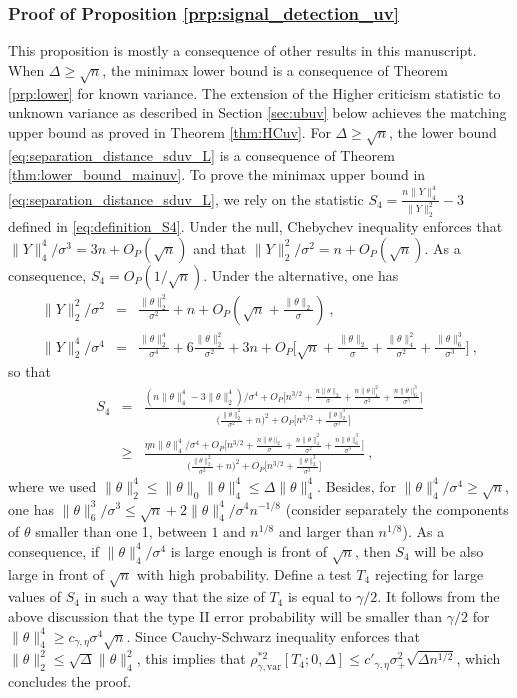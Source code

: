 \documentclass[twoside,11pt]{article}
\def\beqn{\begin{eqnarray*}}
\def\eeqn{\end{eqnarray*}}
\newcommand{\<}{\langle}
\renewcommand{\>}{\rangle}
\begin{document}
\subsubsection{Proof of Proposition \ref{prp:signal_detection_uv}}
This proposition is mostly a consequence of other results in this manuscript. When $\Delta\geq \sqrt{n}$, the minimax lower bound is a consequence of Theorem \ref{prp:lower} for known variance. The extension of the Higher criticism statistic to unknown variance as described in Section \ref{sec:ubuv} below achieves the matching upper bound as proved in Theorem \ref{thm:HCuv}. For $\Delta\geq \sqrt{n}$, the lower bound \eqref{eq:separation_distance_sduv_L} is a consequence of Theorem \ref{thm:lower_bound_mainuv}. To prove the minimax upper bound in \eqref{eq:separation_distance_sduv_L}, we rely on the statistic $S_4 = \frac{n\|Y\|_4^4}{\|Y\|_2^2}-3$ defined in \eqref{eq:definition_S4}. Under the null, Chebychev inequality enforces that $\|Y\|_4^4/\sigma^3= 3n + O_P(\sqrt{n})$ and that $\|Y\|_2^2/\sigma^2= n+O_P(\sqrt{n})$. As a consequence, $S_4= O_P(1/\sqrt{n})$. Under the alternative, one has 
\beqn 
\|Y\|_2^2/\sigma^2&=& \frac{\|\theta\|_2^2}{\sigma^2} + n + O_P(\sqrt{n} + \frac{\|\theta\|_2}{\sigma})\ ,\\
\|Y\|_2^4/\sigma^4&=& \frac{\|\theta\|_2^4}{\sigma^4} +  6\frac{\|\theta\|_2^2}{\sigma^2} + 3n +  O_P\big[\sqrt{n} + \frac{\|\theta\|_2}{\sigma} + \frac{\|\theta\|_4^2}{\sigma^2} +   \frac{\|\theta\|_6^3}{\sigma^3} \big]\ ,
\eeqn
so that 
\beqn 
S_4& =& \frac{(n\|\theta\|_4^4-3 \|\theta\|_2^4)/\sigma^4+ O_P\big[n^{3/2} + \frac{n\|\theta\|_2}{\sigma} + \frac{n\|\theta\|_4^2}{\sigma^2} +   \frac{n\|\theta\|_6^3}{\sigma^3}\big]}{\big(\frac{\|\theta\|_2^2	}{\sigma^2} + n\big)^2+ O_P\big[n^{3/2}+\frac{\|\theta\|_2^3}{\sigma^3}\big] }\\
&\geq & \frac{\eta n\|\theta\|_4^4/\sigma^4+ O_P\big[n^{3/2} + \frac{n\|\theta\|_2}{\sigma} + \frac{n\|\theta\|_4^2}{\sigma^2} +   \frac{n\|\theta\|_6^3}{\sigma^3}\big]}{\big(\frac{\|\theta\|_2^2}{\sigma^2} + n\big)^2+ O_P\big[n^{3/2}+\frac{\|\theta\|_2^3}{\sigma^3}\big] }\ ,
\eeqn 
where we used $\|\theta\|_2^4\leq \|\theta\|_0\|\theta\|_4^4\leq \Delta\|\theta\|_4^4$. Besides, for $\|\theta\|_4^4/\sigma^4\geq \sqrt{n}$, one has  $\|\theta\|_6^3/\sigma^3 \leq \sqrt{n}+ 2\|\theta\|_4^4/\sigma^4 n^{-1/8}$ (consider separately the components of $\theta$ smaller than one 1, between $1$ and $n^{1/8}$ and larger than $n^{1/8}$). As a consequence, if $\|\theta\|_4^4/\sigma^4$ is large enough is front of $\sqrt{n}$, then $S_4$ will be also large in front of $\sqrt{n}$ with high probability. Define a test $T_4$ rejecting for large values of $S_4$ in such a way that the size of $T_4$ is equal to $\gamma/2$. It follows from the above discussion that the type II error probability will be smaller than $\gamma/2$ for $\|\theta\|_4^4\geq c_{\gamma,\eta}\sigma^4\sqrt{n}$. Since Cauchy-Schwarz inequality enforces that $\|\theta\|_2^2\leq \sqrt{\Delta}\|\theta\|_4^2$, this implies that $\rho_{\gamma,\mathrm{var}}^{*2}[T_4;0,\Delta] \leq c'_{\gamma,\eta} \sigma_+^2 \sqrt{\Delta n^{1/2}}$, which concludes the proof. 
\end{document}
